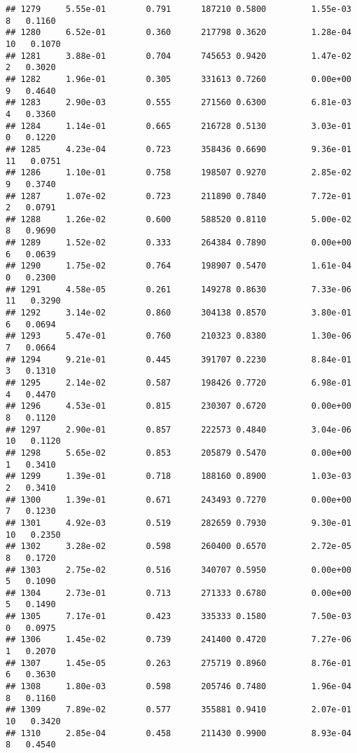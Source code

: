 \documentclass[
]{article}
\begin{document}
\begin{verbatim}
## 1279     5.55e-01        0.791      187210 0.5800         1.55e-03   8   0.1160
## 1280     6.52e-01        0.360      217798 0.3620         1.28e-04  10   0.1070
## 1281     3.88e-01        0.704      745653 0.9420         1.47e-02   2   0.3020
## 1282     1.96e-01        0.305      331613 0.7260         0.00e+00   9   0.4640
## 1283     2.90e-03        0.555      271560 0.6300         6.81e-03   4   0.3360
## 1284     1.14e-01        0.665      216728 0.5130         3.03e-01   0   0.1220
## 1285     4.23e-04        0.723      358436 0.6690         9.36e-01  11   0.0751
## 1286     1.10e-01        0.758      198507 0.9270         2.85e-02   9   0.3740
## 1287     1.07e-02        0.723      211890 0.7840         7.72e-01   2   0.0791
## 1288     1.26e-02        0.600      588520 0.8110         5.00e-02   8   0.9690
## 1289     1.52e-02        0.333      264384 0.7890         0.00e+00   6   0.0639
## 1290     1.75e-02        0.764      198907 0.5470         1.61e-04   0   0.2300
## 1291     4.58e-05        0.261      149278 0.8630         7.33e-06  11   0.3290
## 1292     3.14e-02        0.860      304138 0.8570         3.80e-01   6   0.0694
## 1293     5.47e-01        0.760      210323 0.8380         1.30e-06   7   0.0664
## 1294     9.21e-01        0.445      391707 0.2230         8.84e-01   3   0.1310
## 1295     2.14e-02        0.587      198426 0.7720         6.98e-01   4   0.4470
## 1296     4.53e-01        0.815      230307 0.6720         0.00e+00   8   0.1120
## 1297     2.90e-01        0.857      222573 0.4840         3.04e-06  10   0.1120
## 1298     5.65e-02        0.853      205879 0.5470         0.00e+00   1   0.3410
## 1299     1.39e-01        0.718      188160 0.8900         1.03e-03   2   0.3410
## 1300     1.39e-01        0.671      243493 0.7270         0.00e+00   7   0.1230
## 1301     4.92e-03        0.519      282659 0.7930         9.30e-01  10   0.2350
## 1302     3.28e-02        0.598      260400 0.6570         2.72e-05   8   0.1720
## 1303     2.75e-02        0.516      340707 0.5950         0.00e+00   5   0.1090
## 1304     2.73e-01        0.713      271333 0.6780         0.00e+00   5   0.1490
## 1305     7.17e-01        0.423      335333 0.1580         7.50e-03   0   0.0975
## 1306     1.45e-02        0.739      241400 0.4720         7.27e-06   1   0.2070
## 1307     1.45e-05        0.263      275719 0.8960         8.76e-01   6   0.3630
## 1308     1.80e-03        0.598      205746 0.7480         1.96e-04   8   0.1160
## 1309     7.89e-02        0.577      355881 0.9410         2.07e-01  10   0.3420
## 1310     2.85e-04        0.458      211430 0.9900         8.93e-04   8   0.4540

\end{verbatim}
\end{document}
